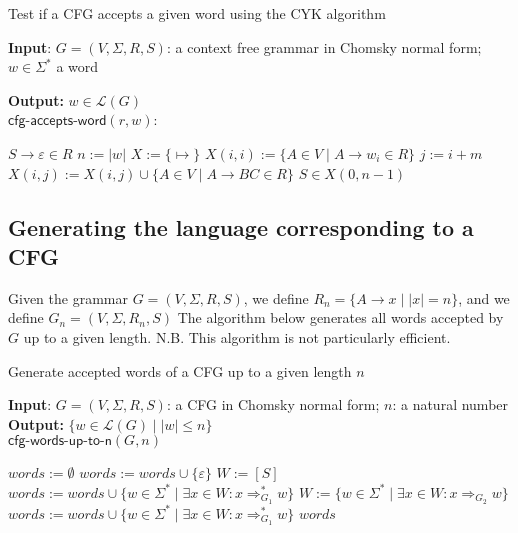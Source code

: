 \documentclass[11pt]{article}
\newcommand*{\Language}[1]{\ensuremath{\mathcal{L}(#1)}}
\newcommand{\emptymap}{\ensuremath{\{ \mapsto \}}}
\begin{document}
\begin{algorithm}
\small
\caption{Test if a CFG accepts a given word using the CYK algorithm }
\vspace*{1ex}
{\textbf{Input}:}
$G = (V, \Sigma, R, S)$: a context free grammar in Chomsky normal form; $w \in \Sigma^*$ a word

\textbf{Output:}
$w \in \Language{G}$ \\

$\textsf{cfg-accepts-word}(r, w)$:
\begin{algorithmic}[1]
  \State \Return $S \rightarrow \varepsilon \in R$
\EndIf
\State $n := |w|$
\State $X := \emptymap$ 
\State {}
  \State $X(i,i) := \{ A \in V \mid A \rightarrow w_i \in R \}$
\EndFor
{}
    \State $j := i + m$
        \State $X(i,j) := X(i,j) \cup \{ A \in V \mid A \rightarrow BC \in R \}$
      \EndFor
    \EndFor
  \EndFor
\EndFor
\State \Return $S \in X(0,n-1)$
\end{algorithmic}
\end{algorithm}

\subsection{Generating the language corresponding to a CFG}

Given the grammar $G = (V, \Sigma, R, S)$, we define
$R_n = \{ A \rightarrow x \mid |x| = n \}$, and we define $G_n = (V, \Sigma, R_n, S)$
The algorithm below generates all words accepted by $G$ up to a given length. N.B. This
algorithm is not particularly efficient.

\begin{algorithm}
\small
\caption{Generate accepted words of a CFG up to a given length $n$}
\vspace*{1ex}
{\textbf{Input}:}
$G = (V, \Sigma, R, S)$: a CFG in Chomsky normal form; $n$: a natural number \\
\textbf{Output:}
$ \{ w \in \Language{G} \mid |w| \leq n \} $ \\

$\textsf{cfg-words-up-to-n}(G, n)$
\begin{algorithmic}[1]
\State $words := \emptyset$
  \State $words := words \cup \{ \varepsilon \}$
\EndIf 
\State $W := [S]$
\State $words := words \cup \{ w \in \Sigma^\ast \mid \exists x \in W: x \Rightarrow^*_{G_1} w \}$
  \State $W := \{ w \in \Sigma^\ast \mid \exists x \in W: x \Rightarrow_{G_2} w \}$
  \State $words := words \cup \{ w \in \Sigma^\ast \mid \exists x \in W: x \Rightarrow^*_{G_1} w \}$
\EndFor
\State \Return $words$
\end{algorithmic}
\end{algorithm}
\end{document}
